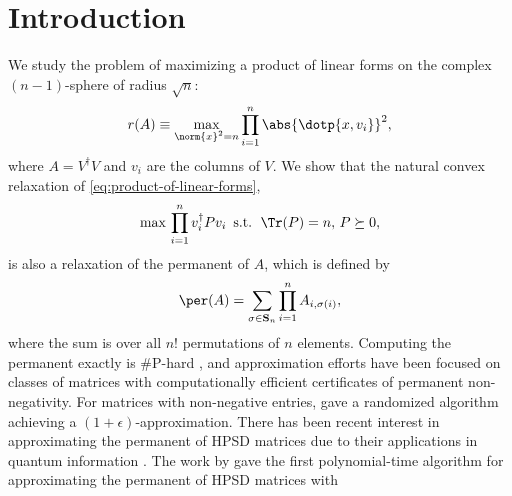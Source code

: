 
\newcommand\numberthis{\addtocounter{equation}{1}\tag{\theequation}}
\DeclareMathOperator{\rel}{rel}
\DeclareMathOperator{\spann}{span}
\DeclareMathOperator{\GammaText}{Gamma}
\newcommand{\cnormal}{\mathcal{C}\mathcal{N}}
\newcommand{\iid}{i.i.d.\ }

\section{Introduction}
We study the problem of maximizing a product of linear forms on the complex
$(n-1)$-sphere of radius $\sqrt n$:
\begin{align} \label{eq:product-of-linear-forms}
  r(A) \equiv \max_{\norm{x}^2=n} \prod_{i=1}^n \abs{\dotp{x, v_i}}^2,
\end{align}
where $A = V^\dagger V$ and $v_i$ are the columns of $V$. We show that the
natural convex relaxation of \eqref{eq:product-of-linear-forms},
\begin{align} \label{eq:convex-rel}
  \max \, \prod_{i=1}^n v_i^\dagger P v_i \,\mbox{ s.t. }\,
  \Tr(P) = n,\, P \succeq 0,
\end{align}
is also a relaxation of the permanent of $A$, which is defined by
\begin{align} \label{eq:def-per}
  \per(A) = \sum_{\sigma \in \mathbf{S}_n} \prod_{i=1}^n A_{i,\sigma(i)},
\end{align}
where the sum is over all $n!$ permutations of $n$ elements. Computing the
permanent exactly is \#P-hard \cite{Valiantcomplexitycomputingpermanent1979},
and approximation efforts have been focused on classes of matrices with
computationally efficient certificates of permanent non-negativity. For matrices
with non-negative entries, \cite{JerrumPolynomialtimeApproximationAlgorithm2004}
gave a randomized algorithm achieving a $(1+\epsilon)$-approximation. There has
been recent interest in approximating the permanent of HPSD matrices due to
their applications in quantum information \cite{GrierNewhardnessresults2018}.
The work by \cite{AnariSimplyExponentialApproximation2017a} gave the first
polynomial-time algorithm for approximating the permanent of HPSD matrices with
